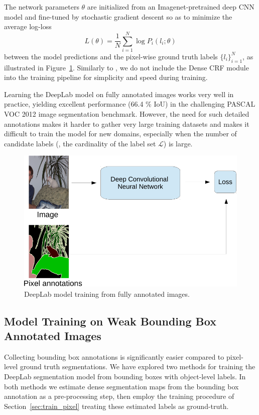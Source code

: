 The network parameters $\theta$ are initialized from an
Imagenet-pretrained deep CNN model \citep{simonyan2014very} and
fine-tuned by stochastic gradient descent so as to minimize the
average log-loss 
\begin{equation}
  \label{eq:log_loss}
  L(\theta) = \frac{1}{N} \sum_{i = 1}^N \log P_i(l_i; \theta)
\end{equation}
between the model predictions and the pixel-wise ground truth
labels $\{l_i\}_{i = 1}^N$, as illustrated in
Figure~\ref{fig:model_train_pixel}. Similarly to
\citet{chen2014semantic}, we do not include the Dense CRF module into
the training pipeline for simplicity and speed during training.

Learning the DeepLab model on fully annotated images works very well
in practice, yielding excellent performance (66.4 \% IoU) in the
challenging PASCAL VOC 2012 image segmentation benchmark. However, the
need for such detailed annotations makes it harder to gather very
large training datasets and makes it difficult to train the model
for new domains, especially when the number of candidate labels
(\ie, the cardinality of the label set $\mathcal{L}$) is large.

\begin{figure}[htbp!]
  \centering
  \includegraphics[width=0.9\linewidth]{fig/model_train_pixel.pdf} 
  \caption{DeepLab model training from fully annotated images.}
  \label{fig:model_train_pixel}
\end{figure}

\subsection{Model Training on Weak Bounding Box Annotated Images}
\label{sec:train_bbox}

Collecting bounding box annotations is significantly easier compared
to pixel-level ground truth segmentations. We have explored two
methods for training the DeepLab segmentation model from bounding
boxes with object-level labels. In both methods we estimate dense
segmentation maps from the bounding box annotation as a pre-processing
step, then employ the training procedure of
Section~\ref{sec:train_pixel} treating these estimated labels as
ground-truth.

